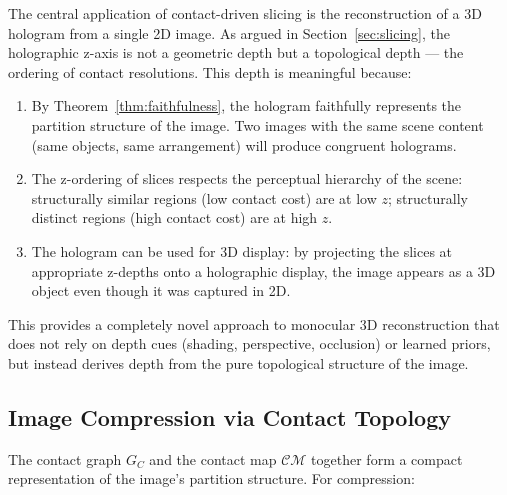 \documentclass[twocolumn]{article}
\theoremstyle{plain}
\theoremstyle{definition}
\newcommand{\CM}{\mathcal{CM}}
\newcommand{\GC}{G_C}
\begin{document}
The central application of contact-driven slicing is the reconstruction of a
3D hologram from a single 2D image. As argued in Section~\ref{sec:slicing}, the
holographic z-axis is not a geometric depth but a topological depth --- the
ordering of contact resolutions. This depth is meaningful because:

\begin{enumerate}[label=(\roman*)]
\item By Theorem~\ref{thm:faithfulness}, the hologram faithfully represents the
  partition structure of the image. Two images with the same scene content (same
  objects, same arrangement) will produce congruent holograms.

\item The z-ordering of slices respects the perceptual hierarchy of the scene:
  structurally similar regions (low contact cost) are at low $z$; structurally
  distinct regions (high contact cost) are at high $z$.

\item The hologram can be used for 3D display: by projecting the slices at
  appropriate z-depths onto a holographic display, the image appears as a 3D
  object even though it was captured in 2D.
\end{enumerate}

This provides a completely novel approach to monocular 3D reconstruction that does
not rely on depth cues (shading, perspective, occlusion) or learned priors, but
instead derives depth from the pure topological structure of the image.

\subsection{Image Compression via Contact Topology}

The contact graph $\GC$ and the contact map $\CM$ together form a compact
representation of the image's partition structure. For compression:
\end{document}
